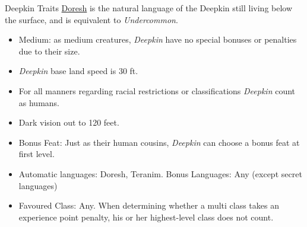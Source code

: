 \begin{35e}{Deepkin Traits}
  \hyperref[sec:Speak Language]{Doresh} is the natural language of the
  Deepkin still living below the surface, and is equivalent to
  \emph{Undercommon}.

  \begin{itemize}[noitemsep]
    \item Medium: as medium creatures, \emph{Deepkin} have no special bonuses or
    penalties due to their size.
    \item \emph{Deepkin} base land speed is 30 ft.
    \item For all manners regarding racial restrictions or classifications
    \emph{Deepkin} count as humans.
    \item Dark vision out to 120 feet.
    \item Bonus Feat: Just as their human cousins, \emph{Deepkin} can choose a
    bonus feat at first level.
    \item Automatic languages: Doresh, Teranim. Bonus Languages: Any (except
      secret languages)
    \item Favoured Class: Any. When determining whether a multi class takes an
    experience point penalty, his or her highest-level class does not count.
  \end{itemize}
\end{35e}
